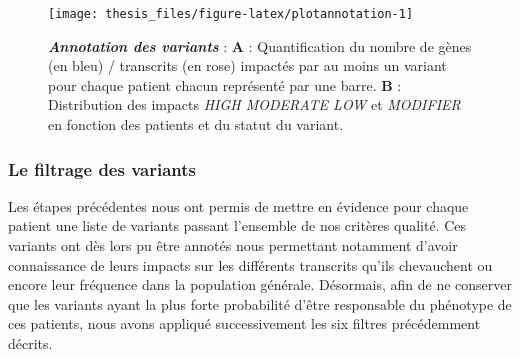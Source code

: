 \documentclass[12pt,a4paper,twoside]{ugathesis}
\begin{document}
\newpage

\begin{figure}

{\centering \texttt{[image: thesis\_files/figure-latex/plotannotation-1]} 

}

\caption[Annotation des variants]{\textbf{\emph{Annotation des variants}} :
\textbf{A} : Quantification du nombre de gènes (en bleu) / transcrits
(en rose) impactés par au moins un variant pour chaque patient chacun
représenté par une barre. \textbf{B} : Distribution des impacts
\emph{HIGH MODERATE LOW} et \emph{MODIFIER} en fonction des patients et
du statut du variant.}\label{fig:plotannotation}
\end{figure}








\subsubsection{Le filtrage des
variants}\label{le-filtrage-des-variants-2}

Les étapes précédentes nous ont permis de mettre en évidence pour chaque
patient une liste de variants passant l'ensemble de nos critères
qualité. Ces variants ont dès lors pu être annotés nous permettant
notamment d'avoir connaissance de leurs impacts sur les différents
transcrits qu'ils chevauchent ou encore leur fréquence dans la
population générale. Désormais, afin de ne conserver que les variants
ayant la plus forte probabilité d'être responsable du phénotype de ces
patients, nous avons appliqué successivement les six filtres
précédemment décrits.
\end{document}
